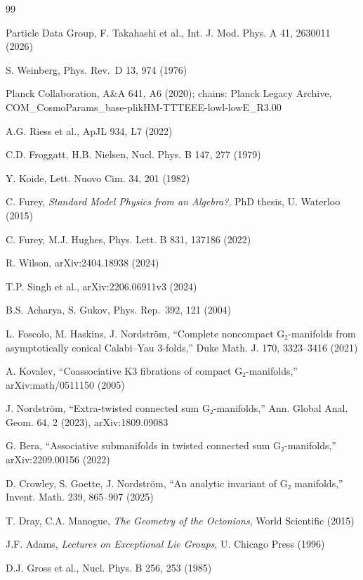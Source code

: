 
\begin{thebibliography}{99}

 Particle Data Group, F. Takahashi et al., Int. J. Mod. Phys. A 41, 2630011 (2026)

 S. Weinberg, Phys. Rev.~D 13, 974 (1976)

 Planck Collaboration, A\&A 641, A6 (2020); chains: Planck Legacy Archive, COM\_CosmoParams\_base-plikHM-TTTEEE-lowl-lowE\_R3.00

 A.G. Riess et al., ApJL 934, L7 (2022)

 C.D. Froggatt, H.B. Nielsen, Nucl. Phys. B 147, 277 (1979)

 Y. Koide, Lett. Nuovo Cim. 34, 201 (1982)

 C. Furey, \emph{Standard Model Physics from an Algebra?}, PhD thesis, U. Waterloo (2015)

 C. Furey, M.J. Hughes, Phys. Lett. B 831, 137186 (2022)

 R. Wilson, arXiv:2404.18938 (2024)

 T.P. Singh et al., arXiv:2206.06911v3 (2024)

 B.S. Acharya, S. Gukov, Phys. Rep.~392, 121 (2004)

 L. Foscolo, M. Haskins, J. Nordström, ``Complete noncompact G₂-manifolds from asymptotically conical Calabi--Yau 3-folds,'' Duke Math. J. 170, 3323--3416 (2021)

 A. Kovalev, ``Coassociative K3 fibrations of compact G₂-manifolds,'' arXiv:math/0511150 (2005)

 J. Nordström, ``Extra-twisted connected sum G₂-manifolds,'' Ann. Global Anal. Geom. 64, 2 (2023), arXiv:1809.09083

 G. Bera, ``Associative submanifolds in twisted connected sum G₂-manifolds,'' arXiv:2209.00156 (2022)

 D. Crowley, S. Goette, J. Nordström, ``An analytic invariant of G₂ manifolds,'' Invent. Math. 239, 865--907 (2025)

 T. Dray, C.A. Manogue, \emph{The Geometry of the Octonions}, World Scientific (2015)

 J.F. Adams, \emph{Lectures on Exceptional Lie Groups}, U. Chicago Press (1996)

 D.J. Gross et al., Nucl. Phys. B 256, 253 (1985)


\end{thebibliography}

